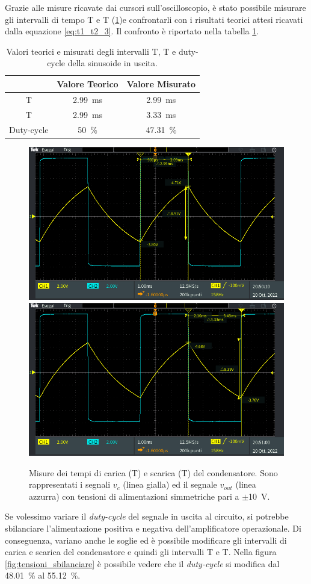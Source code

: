 \noindent
Grazie alle misure ricavate dai cursori sull'oscilloscopio, è stato possibile misurare gli intervalli di tempo T e T (\Fig\ref{fig:t1_t2_3})e confrontarli con i risultati teorici attesi ricavati dalla equazione \ref{eq:t1_t2_3}. Il confronto è riportato nella tabella \ref{tab:misure_duty_3}.
\begin{table}[h]
	\centering
	\begin{tabular}{|c|c|c|}
		\hline
		& Valore Teorico & Valore Misurato \\ \hline
		T\sub{1} &\SI{2.99}{\milli\second} & \SI{2.99}{\milli\second} \\ \hline
		T\sub{2} &\SI{2.99}{\milli\second} & \SI{3.33}{\milli\second} \\ \hline
		Duty-cycle & \SI{50}{\percent} & \SI{47.31}{\percent} \\ \hline
	\end{tabular}
	\caption{Valori teorici e misurati degli intervalli T, T e duty-cycle della sinusoide in uscita.}
	\label{tab:misure_duty_3}
\end{table}
\begin{figure}[h]
	\centering
	\includegraphics[width=0.496\linewidth]{./ImageFiles/Laboratorio 3/TEK00014.PNG}
	\includegraphics[width=0.496\linewidth]{./ImageFiles/Laboratorio 3/TEK00016.PNG}
	\caption{Misure dei tempi di carica (T) e scarica (T) del condensatore. Sono rappresentati i segnali $v_{c}$ (linea gialla) ed il segnale $v_{out}$ (linea azzurra) con tensioni di alimentazioni simmetriche pari a $\pm$\SI{10}{\volt}.}
	\label{fig:t1_t2_3}
\end{figure} 
Se volessimo variare il \textit{duty-cycle} del segnale in uscita al circuito, si potrebbe sbilanciare l'alimentazione positiva e negativa dell'amplificatore operazionale. Di conseguenza, variano anche le soglie ed è possibile modificare gli intervalli di carica e scarica del condensatore e quindi gli intervalli T e T. Nella figura \Fig\ref{fig:tensioni_sbilanciare} è possibile vedere che il \textit{duty-cycle} si modifica dal \SI{48.01}{\percent} al \SI{55.12}{\percent}.
